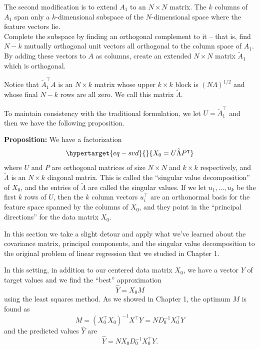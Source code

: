\documentclass[
  11pt,
  letterpaper,
]{scrbook}
\theoremstyle{plain}
\theoremstyle{plain}
\theoremstyle{remark}
\begin{document}
The second modification is to extend \(A_{1}\) to an \(N\times N\)
matrix. The \(k\) columns of \(A_1\) span only a \(k\)-dimensional
subspace of the \(N\)-dimensional space where the feature vectors lie.\\
Complete the subspace by finding an orthogonal complement to it -- that
is, find \(N-k\) mutually orthogonal unit vectors all orthogonal to the
column space of \(A_1\). By adding these vectors to \(A\) as columns,
create an extended \(N\times N\) matrix \(\tilde{A}_1\) which is
orthogonal.

Notice that \(\tilde{A}_{1}^{\intercal}A\) is an \(N\times k\) matrix
whose upper \(k\times k\) block is \((N\Lambda)^{1/2}\) and whose final
\(N-k\) rows are all zero. We call this matrix \(\tilde{\Lambda}\).

To maintain consistency with the traditional formulation, we let
\(U=\tilde{A}_{1}^{\intercal}\) and then we have the following
proposition.

\textbf{Proposition:} We have a factorization
\begin{equation}\protect\hypertarget{eq-svd}{}{
X_{0} = U\tilde{\Lambda}P^{\intercal}
}\label{eq-svd}\end{equation} where \(U\) and \(P\) are orthogonal
matrices of size \(N\times N\) and \(k\times k\) respectively, and
\(\tilde{\Lambda}\) is an \(N\times k\) diagonal matrix. This is called
the ``singular value decomposition'' of \(X_{0}\), and the entries of
\(\tilde{\Lambda}\) are called the singular values. If we let
\(u_1,\ldots, u_k\) be the first \(k\) rows of \(U\), then the \(k\)
column vectors \(u_{i}^{\intercal}\) are an orthonormal basis for the
feature space spanned by the columns of \(X_{0}\), and they point in the
``principal directions'' for the data matrix \(X_{0}\).

In this section we take a slight detour and apply what we've learned
about the covariance matrix, principal components, and the singular
value decomposition to the original problem of linear regression that we
studied in Chapter 1.

In this setting, in addition to our centered data matrix \(X_{0}\), we
have a vector \(Y\) of target values and we find the ``best''
approximation \[
\hat{Y} = X_{0}M
\] using the least squares method. As we showed in Chapter 1, the
optimum \(M\) is found as \[
M = (X_{0}^{\intercal}X_{0})^{-1}X^{\intercal}Y = ND_{0}^{-1}X_0^{\intercal}Y
\] and the predicted values \(\hat{Y}\) are \[
\hat{Y} = NX_{0}D_{0}^{-1}X_0^{\intercal}Y.
\]
\end{document}
